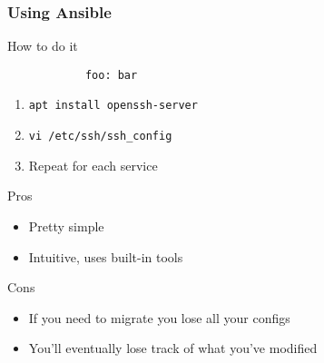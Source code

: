 \documentclass{beamer}
\begin{document}
\begin{frame}[fragile]
    \frametitle{Using Ansible}
    \begin{block}{How to do it}
        \begin{verbatim}
            foo: bar
        \end{verbatim}
        \begin{enumerate}
            \item \texttt{apt install openssh-server}
            \item \texttt{vi /etc/ssh/ssh\_config}
            \item Repeat for each service
        \end{enumerate}
    \end{block}

    \pause

    \begin{alertblock}{Pros}
        \begin{itemize}
            \item Pretty simple
            \item Intuitive, uses built-in tools
        \end{itemize}
    \end{alertblock}

    \pause

    \begin{alertblock}{Cons}
        \begin{itemize}
            \item If you need to migrate you lose all your configs
            \item You'll eventually lose track of what you've modified
        \end{itemize}
    \end{alertblock}
\end{frame}
\end{document}
